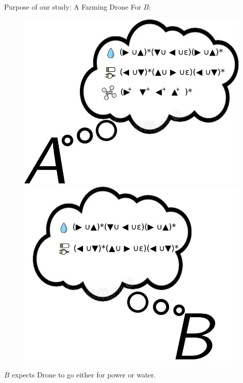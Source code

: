 \documentclass{beamer}
\begin{document}
\begin{frame}{Purpose of our study: A Farming Drone}
    For $B$:
    \begin{figure}
        \centering
        \includegraphics[scale=0.2]{images/A-expectall.jpg}
        \includegraphics[scale=0.2]{images/B-expectall.jpg}
    \end{figure}
    $B$ expects Drone to go either for power or water.
\end{frame}
\end{document}
